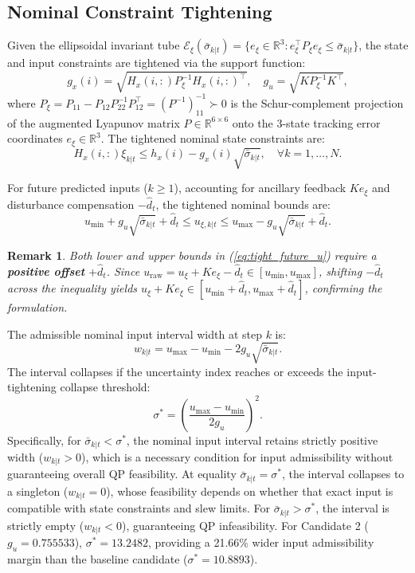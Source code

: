 \documentclass[journal]{IEEEtran}
\newtheorem{remark}{Remark}
\begin{document}
\subsection{Nominal Constraint Tightening}

Given the ellipsoidal invariant tube $\mathcal{E}_\xi(\bar\sigma_{k|t}) = \{e_\xi \in \mathbb{R}^3 : e_\xi^\top P_\xi e_\xi \le \bar\sigma_{k|t}\}$, the state and input constraints are tightened via the support function:
\begin{equation}
g_x(i) = \sqrt{H_x(i,:) P_\xi^{-1} H_x(i,:)^\top}, \quad g_u = \sqrt{K P_\xi^{-1} K^\top},
\end{equation}
where $P_\xi = P_{11} - P_{12} P_{22}^{-1} P_{12}^\top = (P^{-1})_{11}^{-1} \succ 0$ is the Schur-complement projection of the augmented Lyapunov matrix $P \in \mathbb{R}^{6 \times 6}$ onto the 3-state tracking error coordinates $e_\xi \in \mathbb{R}^3$.
The tightened nominal state constraints are:
\begin{equation}
H_x(i,:) \xi_{k|t} \le h_x(i) - g_x(i) \sqrt{\bar\sigma_{k|t}}, \quad \forall k = 1, \ldots, N.
\end{equation}

For future predicted inputs ($k \ge 1$), accounting for ancillary feedback $K e_{\xi}$ and disturbance compensation $-\hat d_t$, the tightened nominal bounds are:
\begin{equation}
u_{\min} + g_u \sqrt{\bar\sigma_{k|t}} + \hat d_t \le u_{\xi,k|t} \le u_{\max} - g_u \sqrt{\bar\sigma_{k|t}} + \hat d_t.
\label{eq:tight_future_u}
\end{equation}
\begin{remark}
Both lower and upper bounds in (\ref{eq:tight_future_u}) require a \textbf{positive offset} $+\hat d_t$. Since $u_{\mathrm{raw}} = u_\xi + K e_\xi - \hat d_t \in [u_{\min}, u_{\max}]$, shifting $-\hat d_t$ across the inequality yields $u_\xi + K e_\xi \in [u_{\min} + \hat d_t, u_{\max} + \hat d_t]$, confirming the formulation.
\end{remark}

The admissible nominal input interval width at step $k$ is:
\begin{equation}
w_{k|t} = u_{\max} - u_{\min} - 2 g_u \sqrt{\bar\sigma_{k|t}}.
\end{equation}
The interval collapses if the uncertainty index reaches or exceeds the input-tightening collapse threshold:
\begin{equation}
\sigma^* = \left(\frac{u_{\max} - u_{\min}}{2 g_u}\right)^2.
\end{equation}
Specifically, for $\bar\sigma_{k|t} < \sigma^*$, the nominal input interval retains strictly positive width ($w_{k|t} > 0$), which is a necessary condition for input admissibility without guaranteeing overall QP feasibility. At equality $\bar\sigma_{k|t} = \sigma^*$, the interval collapses to a singleton ($w_{k|t} = 0$), whose feasibility depends on whether that exact input is compatible with state constraints and slew limits. For $\bar\sigma_{k|t} > \sigma^*$, the interval is strictly empty ($w_{k|t} < 0$), guaranteeing QP infeasibility. For Candidate 2 ($g_u = 0.755533$), $\sigma^* = 13.2482$, providing a 21.66\% wider input admissibility margin than the baseline candidate ($\sigma^* = 10.8893$).
\end{document}
